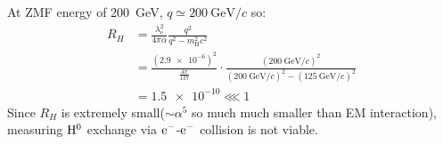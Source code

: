 \begin{parts}
	At ZMF energy of \SI{200}{\giga\electronvolt}, $q \simeq \SI{200}{\giga\electronvolt /c}$ so:
	\begin{align*}
		R_H &= \frac{\lambda_\mathrm{e}^2}{4\pi\alpha} \frac{q^2}{q^2 - m_\mathrm{H}^2 c^2} \\
		&= \frac{(\num{2.9e-6})^2}{\frac{4\pi}{137}} \cdot \frac{(\SI{200}{\giga\electronvolt /c})^2}{(\SI{200}{\giga\electronvolt /c})^2 - (\SI{125}{\giga\electronvolt /c})^2} \\
		&= \num{1.5e-10} \lll 1
	\end{align*}
	Since $R_H$ is extremely small($\sim \alpha^5$ so much much smaller than EM interaction), measuring $\mathrm{H}^{0}$ exchange via $\mathrm{e}^{-}$-$\mathrm{e}^{-}$ collision is not viable.
\end{parts}